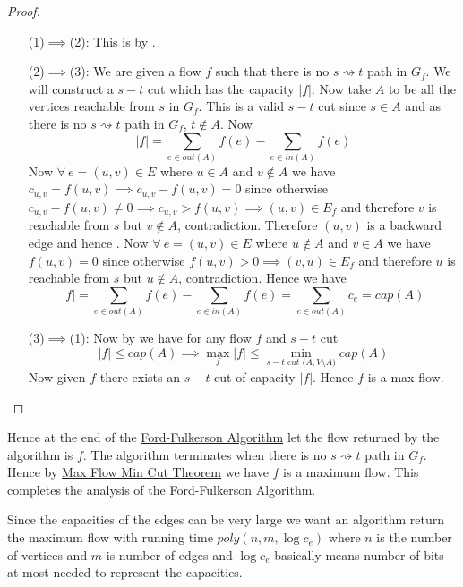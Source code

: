 \begin{proof}
	\begin{itemize}[leftmargin=2cm]
		\item[(1)$\implies$(2):] This is by .
		\item[(2)$\implies$(3):] We are given a flow $f$ such that there is no $s\rightsquigarrow t$ path in $G_f$. We will construct a $s-t$ cut which has the capacity $|f|$. Now take $A$ to be all the vertices reachable from $s$ in $G_f$. This is a valid $s-t$ cut since $s\in A$ and as there is no $s\rightsquigarrow t$ path in $G_f$, $t\notin A$. Now $$|f|=\sum_{e\in \textit{out$(A)$}}f(e)-\sum_{e\in\textit{in$(A)$}}f(e)$$Now $\forall\ e=(u,v)\in E$ where $u\in A$ and $v\notin A$ we have  $c_{u,v}=f(u,v)\implies c_{u,v}-f(u,v)=0$ since otherwise $c_{u,v}-f(u,v)\neq 0\implies c_{u,v}>f(u,v)\implies (u,v)\in E_f$ and therefore $v$ is reachable from $s$ but $v\notin A$, contradiction. Therefore $(u,v)$ is a backward edge and hence . Now $\forall\ e=(u,v)\in E$ where $u\notin A$ and $v\in A$ we have $f(u,v)=0$ since otherwise   $f(u,v)>0\implies (v,u)\in E_f$ and therefore $u$ is reachable from $s$ but $u\notin A$, contradiction. Hence we have $$|f|=\sum_{e\in \textit{out$(A)$}}f(e)-\sum_{e\in\textit{in$(A)$}}f(e)=\sum_{e\in \textit{out$(A)$}}c_e=\textit{cap}(A)$$
		\item[(3)$\implies$(1):] Now by  we have for any flow $f$ and $s-t$ cut $$|f|\leq \textit{cap$(A)$}\implies \max\limits_f|f|\leq\min\limits_{s-t\textit{ cut $(A,V\setminus A$)}}\textit{cap$(A)$}$$Now given $f$ there exists an $s-t$ cut of capacity $|f|$. Hence $f$ is a max flow.
	\end{itemize}
\end{proof}
Hence at the end of the \hyperref[ford-fulkerson]{Ford-Fulkerson Algorithm} let the flow returned by the algorithm is $f$. The algorithm terminates when there is no $s\rightsquigarrow t$ path in $G_f$. Hence by \hyperref[th:maxflowmincut]{Max Flow Min Cut Theorem} we have $f$ is a maximum flow. This completes the analysis of the Ford-Fulkerson Algorithm.

Since the capacities of the edges can be very large we want an algorithm return the maximum flow with running time $\textit{poly}(n,m,\log c_e)$ where $n$ is the number of vertices and $m$ is number of edges and $\log c_e$ basically means number of bits at most needed to represent the capacities. 

